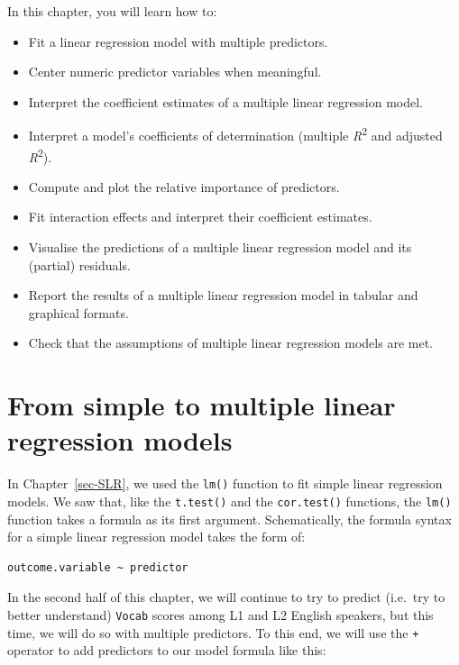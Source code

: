 \documentclass[
  letterpaper,
  DIV=11,
  numbers=noendperiod]{scrreprt}
\providecommand{\tightlist}{%
  \setlength{\itemsep}{0pt}\setlength{\parskip}{0pt}}
\begin{document}
In this chapter, you will learn how to:

\begin{itemize}
\tightlist
\item
  Fit a linear regression model with multiple predictors.
\item
  Center numeric predictor variables when meaningful.
\item
  Interpret the coefficient estimates of a multiple linear regression
  model.
\item
  Interpret a model's coefficients of determination (multiple
  \emph{R}\textsuperscript{2} and adjusted \emph{R}\textsuperscript{2}).
\item
  Compute and plot the relative importance of predictors.
\item
  Fit interaction effects and interpret their coefficient estimates.
\item
  Visualise the predictions of a multiple linear regression model and
  its (partial) residuals.
\item
  Report the results of a multiple linear regression model in tabular
  and graphical formats.
\item
  Check that the assumptions of multiple linear regression models are
  met.
\end{itemize}

\section{From simple to multiple linear regression
models}\label{from-simple-to-multiple-linear-regression-models}

In Chapter~\ref{sec-SLR}, we used the \texttt{lm()} function to fit
simple linear regression models. We saw that, like the \texttt{t.test()}
and the \texttt{cor.test()} functions, the \texttt{lm()} function takes
a formula as its first argument. Schematically, the formula syntax for a
simple linear regression model takes the form of:

\begin{verbatim}
outcome.variable ~ predictor
\end{verbatim}

In the second half of this chapter, we will continue to try to predict
(i.e.~try to better understand) \texttt{Vocab} scores among L1 and L2
English speakers, but this time, we will do so with multiple predictors.
To this end, we will use the \texttt{+} operator to add predictors to
our model formula like this:
\end{document}
